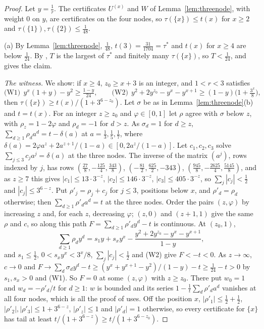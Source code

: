 \documentclass[11pt]{article}
\begin{document}
\begin{proof}
Let $y=\tfrac1r$.  The certificates $U^{(x)}$ and $W$ of
Lemma~\ref{lem:threenode}, with weight $0$ on $y$, are certificates on the
four nodes, so $\tau(\{x\})\le t(x)$ for $x\ge2$ and
$\tau(\{1\}),\tau(\{2\})\le\tfrac1{48}$.

(a) By Lemma~\ref{lem:threenode}, $\tfrac1{48}$, $t(3)=\tfrac{31}{1704}=\tau^*$
and $t(x)$ for $x\ge4$ are below $\tfrac1{24}$.  By
\cite[Theorem~5.3(c)]{coefficient-mass-attainment}, $T$ is the largest of $\tau^*$ and finitely
many $\tau(\{x\})$, so $T<\tfrac1{24}$, and \cite[Theorem~3.1]{coefficient-mass-attainment} gives
the claim.

\emph{The witness.}  We show: if $x\ge4$, $z_0\ge x+3$ is an integer, and
$1<r<3$ satisfies
\[
  \text{(W1)}\ \ y^x(1+y)-y^2\ge\tfrac{1-y}{24},\qquad
  \text{(W2)}\ \ y^2+2y^{z_0}-y^x-y^{x+1}\ge(1-y)\bigl(1+\tfrac{3^x}8\bigr),
\]
then $\tau(\{x\})\ge t(x)/(1+3^{6-z_0})$.  Let $\sigma$ be as in
Lemma~\ref{lem:threenode}(b) and $t=t(x)$.  For an integer $z\ge z_0$ and
$\varphi\in[0,1]$ let $\rho$ agree with $\sigma$ below $z$, with
$\rho_z=1-2\varphi$ and $\rho_d=-1$ for $d>z$.  As $\sigma_d=1$ for $d\ge z$,
$\sum_{d\ge1}\rho_da^d=t-\delta(a)$ at $a=\tfrac13,\tfrac15,\tfrac17$, where
$\delta(a)=2\varphi a^z+2a^{z+1}/(1-a)\in[0,2a^z/(1-a)]$.  Let
$c_1,c_2,c_3$ solve $\sum_{j\le3}c_ja^j=\delta(a)$ at the three nodes.  The
inverse of the matrix $(a^j)$, rows indexed by $j$, has rows
$(\tfrac{27}8,-\tfrac{125}4,\tfrac{343}8)$,
$(-\tfrac{81}2,\tfrac{625}2,-343)$,
$(\tfrac{945}8,-\tfrac{2625}4,\tfrac{5145}8)$, and as $z\ge7$ this gives
$|c_1|\le13\cdot3^{-z}$, $|c_2|\le146\cdot3^{-z}$, $|c_3|\le405\cdot3^{-z}$,
so $\sum_j|c_j|<\tfrac12$ and $|c_j|\le3^{6-z}$.  Put $\rho'_j=\rho_j+c_j$
for $j\le3$, positions below $x$, and $\rho'_d=\rho_d$ otherwise; then
$\sum_{d\ge1}\rho'_da^d=t$ at the three nodes.  Order the pairs
$(z,\varphi)$ by increasing $z$ and, for each $z$, decreasing $\varphi$;
$(z,0)$ and $(z+1,1)$ give the same $\rho$ and $c$, so along this path
$F=\sum_{d\ge1}\rho'_dy^d-t$ is continuous.  At $(z_0,1)$,
\[
  \sum_{d\ge1}\rho_dy^d=s_1y+s_xy^x-\frac{y^2+2y^{z_0}-y^x-y^{x+1}}{1-y},
\]
and $s_1\le\tfrac12$, $0<s_xy^x<3^x/8$, $\sum_j|c_j|<\tfrac12$ and (W2) give
$F<-t<0$.  As $z\to\infty$, $c\to0$ and
$F\to\sum_d\sigma_dy^d-t\ge(y^x+y^{x+1}-y^2)/(1-y)-t\ge\tfrac1{24}-t>0$ by
$s_1,s_x>0$ and (W1).  So $F=0$ at some $(z,\varphi)$ with $z\ge z_0$.  There
put $w_0=1$ and $w_d=-\rho'_d/t$ for $d\ge1$: $w$ is bounded and its series
$1-\tfrac1t\sum_d\rho'_da^d$ vanishes at all four nodes, which is all the
proof of \cite[Lemma~5.1]{coefficient-mass-attainment} uses.  Off the position $x$,
$|\rho'_1|\le\tfrac12+\tfrac12$, $|\rho'_2|,|\rho'_3|\le1+3^{6-z}$,
$|\rho'_z|\le1$ and $|\rho'_d|=1$ otherwise, so every certificate for
$\{x\}$ has tail at least $t/(1+3^{6-z})\ge t/(1+3^{6-z_0})$.


\end{proof}
\end{document}
